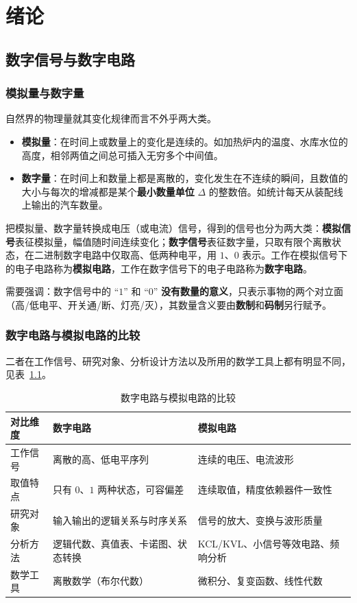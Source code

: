 \chapter{绪论}
\setlength{\parskip}{0.4em}
\setlength{\itemsep}{0.2em}
\setlength{\tabcolsep}{4pt}

\section{数字信号与数字电路}
\subsection{模拟量与数字量}
自然界的物理量就其变化规律而言不外乎两大类。

\begin{itemize}
    \item \textbf{模拟量}：在时间上或数量上的变化是连续的。如加热炉内的温度、水库水位的高度，相邻两值之间总可插入无穷多个中间值。
    \item \textbf{数字量}：在时间上和数量上都是离散的，变化发生在不连续的瞬间，且数值的大小与每次的增减都是某个\textbf{最小数量单位} $\Delta$ 的整数倍。如统计每天从装配线上输出的汽车数量。
\end{itemize}

把模拟量、数字量转换成电压（或电流）信号，得到的信号也分为两大类：\textbf{模拟信号}表征模拟量，幅值随时间连续变化；\textbf{数字信号}表征数字量，只取有限个离散状态，在二进制数字电路中仅取高、低两种电平，用 $1$、$0$ 表示。工作在模拟信号下的电子电路称为\textbf{模拟电路}，工作在数字信号下的电子电路称为\textbf{数字电路}。

需要强调：数字信号中的 ``$1$'' 和 ``$0$'' \textbf{没有数量的意义}，只表示事物的两个对立面（高/低电平、开关通/断、灯亮/灭），其数量含义要由\textbf{数制}和\textbf{码制}另行赋予。

\subsection{数字电路与模拟电路的比较}
二者在工作信号、研究对象、分析设计方法以及所用的数学工具上都有明显不同，见表~\ref{tab:dig_vs_ana}。

\begin{table}[!htbp]
    \centering
    \caption{数字电路与模拟电路的比较}
    \label{tab:dig_vs_ana}
    \begin{tabular}{@{}lll@{}}
        \toprule
        对比维度 & 数字电路 & 模拟电路 \\
        \midrule
        工作信号 & 离散的高、低电平序列 & 连续的电压、电流波形 \\
        取值特点 & 只有 $0$、$1$ 两种状态，可容偏差 & 连续取值，精度依赖器件一致性 \\
        研究对象 & 输入输出的逻辑关系与时序关系 & 信号的放大、变换与波形质量 \\
        分析方法 & 逻辑代数、真值表、卡诺图、状态转换 & KCL/KVL、小信号等效电路、频响分析 \\
        数学工具 & 离散数学（布尔代数） & 微积分、复变函数、线性代数 \\
        \bottomrule
    \end{tabular}
\end{table}

